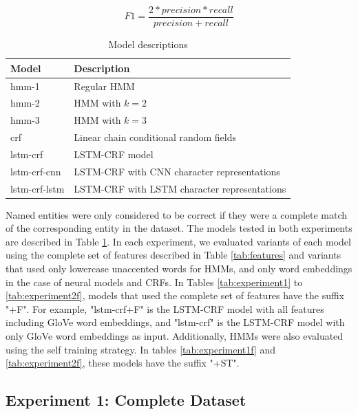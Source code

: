 \documentclass[sigconf]{acmart}
\begin{document}
\begin{equation}
F1 = \frac{2 * precision * recall}{precision + recall}
\end{equation}

\begin{table}[h]
  \small
  \begin{center}
    \begin{tabular}{ ll }
      \toprule
      Model & Description \\
      \midrule
      hmm-1         & Regular HMM \\
      hmm-2         & HMM with $ k=2 $ \\
      hmm-3         & HMM with $ k=3 $ \\
      crf           & Linear chain conditional random fields \\
      lstm-crf      & LSTM-CRF model \cite{Huang2015} \\
      lstm-crf-cnn  & LSTM-CRF with CNN character representations \cite{Ma2016} \\
      lstm-crf-lstm & LSTM-CRF with LSTM character representations \cite{Lample2016} \\
      \bottomrule
    \end{tabular}
  \end{center}
  \caption{Model descriptions}
  \label{tab:models}
\end{table}

Named entities were only considered to be correct if they were a complete match of the 
corresponding entity in the dataset. The models tested in both experiments are described in Table \ref{tab:models}.
In each experiment, we evaluated variants of each model using the complete set of features described in 
Table \ref{tab:features} and variants that used only lowercase unaccented words for HMMs, 
and only word embeddings in the case of neural models and CRFs. In Tables \ref{tab:experiment1} to 
\ref{tab:experiment2f}, models that used the complete set of features have the suffix "+F". For example,
"lstm-crf+F" is the LSTM-CRF model with all features including GloVe word embeddings, and "lstm-crf" is 
the LSTM-CRF model with only GloVe word embeddings as input.
Additionally, HMMs were also evaluated using the self training strategy. In tables \ref{tab:experiment1f} 
and \ref{tab:experiment2f}, these models have the suffix "+ST".

\subsection{Experiment 1: Complete Dataset}
\end{document}
